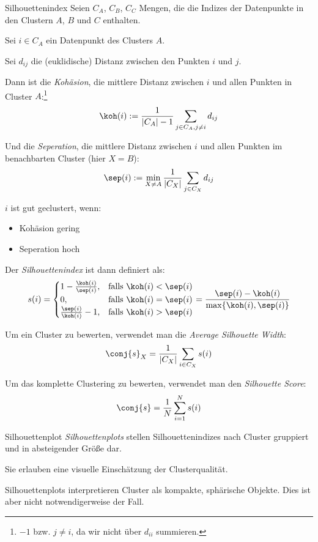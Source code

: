 \begin{defi}{Silhouettenindex}
    Seien $C_A$, $C_B$, $C_C$ Mengen, die die Indizes der Datenpunkte in den Clustern $A$, $B$ und $C$ enthalten.

    Sei $i \in C_A$ ein Datenpunkt des Clusters $A$.

    Sei $d_{ij}$ die (euklidische) Distanz zwischen den Punkten $i$ und $j$.

    Dann ist die \emph{Kohäsion}, die mittlere Distanz zwischen $i$ und allen Punkten in Cluster $A$:\footnote{$-1$ bzw. $j \neq i$, da wir nicht über $d_{ii}$ summieren.}
    \[
        \koh(i) := \frac{1}{|C_A| - 1} \sum_{j \in C_A, j \neq i} d_{ij}
    \]

    Und die \emph{Seperation}, die mittlere Distanz zwischen $i$ und allen Punkten im benachbarten Cluster (hier $X = B$):
    \[
        \sep(i) := \min_{X \neq A} \frac{1}{|C_X|} \sum_{j \in C_X} d_{ij}
    \]

    $i$ ist gut geclustert, wenn:
    \begin{itemize}
        \item Kohäsion gering
        \item Seperation hoch
    \end{itemize}

    Der \emph{Silhouettenindex} ist dann definiert als:
    \[
        s(i) = \begin{cases}
            1 - \frac{\koh(i)}{\sep(i)}, & \text{falls} \ \koh(i) < \sep(i) \\
            0,                           & \text{falls} \ \koh(i) = \sep(i) \\
            \frac{\sep(i)}{\koh(i)} - 1, & \text{falls} \ \koh(i) > \sep(i)
        \end{cases}
        = \frac{\sep(i) - \koh(i)}{\max \{\koh(i), \sep(i)\}}
    \]

    Um ein Cluster zu bewerten, verwendet man die \emph{Average Silhouette Width}:
    \[
        \conj{s}_X = \frac{1}{|C_X|} \sum_{i \in C_X} s(i)
    \]

    Um das komplette Clustering zu bewerten, verwendet man den \emph{Silhouette Score}:
    \[
        \conj{s} = \frac{1}{N} \sum_{i = 1}^{N} s(i)
    \]
\end{defi}

\begin{defi}{Silhouettenplot}
    \emph{Silhouettenplots} stellen Silhouettenindizes nach Cluster gruppiert und in absteigender Größe dar.

    Sie erlauben eine visuelle Einschätzung der Clusterqualität.

    Silhouettenplots interpretieren Cluster als kompakte, sphärische Objekte.
    Dies ist aber nicht notwendigerweise der Fall.
\end{defi}

